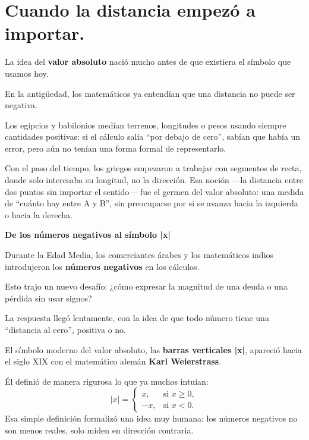 
\vspace{0.5cm}

\vspace{1em}
\section*{Cuando la distancia empezó a importar.}

\begin{reseñaplana}
La idea del \textbf{valor absoluto} nació mucho antes de que existiera el símbolo que usamos hoy.

En la antigüedad, los matemáticos ya entendían que una distancia no puede ser negativa.  

Los egipcios y babilonios medían terrenos, longitudes o pesos usando siempre cantidades positivas: 
si el cálculo salía “por debajo de cero”, sabían que había un error, pero aún no tenían una forma formal de representarlo.  

Con el paso del tiempo, los griegos empezaron a trabajar con segmentos de recta, donde solo 
interesaba su longitud, no la dirección. Esa noción —la distancia entre dos puntos sin importar el sentido— fue el germen del valor 
absoluto: una medida de “cuánto hay entre A y B”, sin preocuparse por si se avanza hacia la izquierda o hacia la derecha.

\textbf{De los números negativos al símbolo |x|}  

Durante la Edad Media, los comerciantes árabes y los matemáticos indios introdujeron los \textbf{números negativos} en los cálculos.  

Esto trajo un nuevo desafío: ¿cómo expresar la magnitud de una deuda o una pérdida sin usar signos?  

La respuesta llegó lentamente, con la idea de que todo número tiene una “distancia al cero”, positiva o no.  

El símbolo moderno del valor absoluto, las \textbf{barras verticales |x|}, apareció hacia el siglo XIX 
con el matemático alemán \textbf{Karl Weierstrass}.  

Él definió de manera rigurosa lo que ya muchos intuían:  
\[
|x| = 
\begin{cases} 
x, & \text{si } x \ge 0,\\
-x, & \text{si } x < 0.
\end{cases}
\]
Esa simple definición formalizó una idea muy humana: los números negativos no son menos reales, solo miden en dirección contraria.  


\end{reseñaplana}
